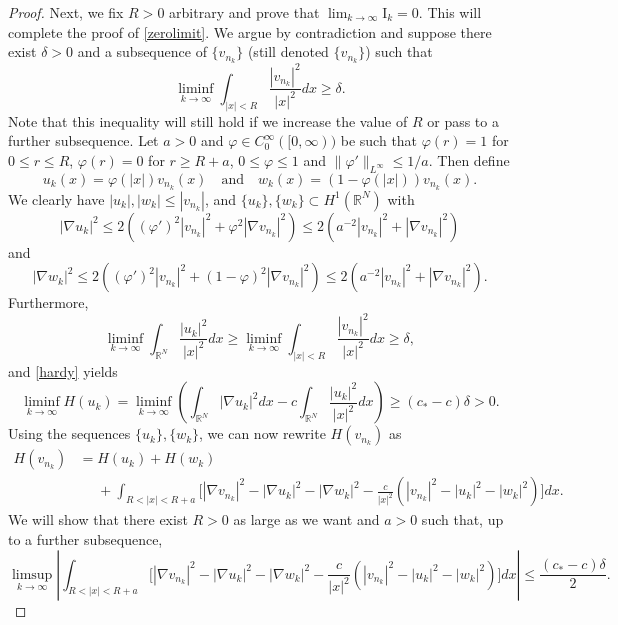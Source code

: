 \documentclass[reqno]{amsart}
\newcommand{\real}{\mathbb{R}}
\newcommand{\rn}{\real^N}
\newcommand{\intrn}{\int_{\real^N}}
\newcommand{\ffi}{\varphi}
\let\le=\leqslant
\let\ge= \geqslant
\theoremstyle{plain}
\theoremstyle{definition}
\numberwithin{equation}{section}
\begin{document}
\begin{proof}
Next, we fix $R>0$ arbitrary and prove that $\lim_{k\to\infty}\mathrm{I}_k=0$. 
This will complete the proof of \eqref{zerolimit}. 
We argue by contradiction and suppose there exist $\delta>0$ 
and a subsequence of $\{v_{n_k}\}$ (still denoted $\{v_{n_k}\}$) such that
\begin{equation*}\label{deltaR}
\liminf_{k\rightarrow\infty}\int_{|x|<R}\frac{|v_{n_k}|^2}{|x|^2}dx\ge\delta.
\end{equation*}
Note that this inequality will still hold if we increase the value of $R$ or pass to a further subsequence.
Let $a>0$ and $\ffi\in C_0^\infty([0,\infty))$ be such that $\ffi(r)=1$ for $0\le r \le R$,
$\ffi(r)=0$ for $r\ge R+a$, $0\le\ffi\le1$ and $\|\ffi'\|_{L^\infty}\le 1/a$. 
Then define
\[
u_k(x)=\ffi(|x|) v_{n_k}(x) \quad\text{and}\quad w_k(x)=(1-\ffi(|x|))v_{n_k}(x).
\]
We clearly have $|u_k|,|w_k|\le|v_{n_k}|$, and $\{u_k\},\{w_k\}\subset H^1(\rn)$ with  
\[
|\nabla u_k|^2 \le 2\left((\ffi')^2|v_{n_k}|^2+\ffi^2|\nabla v_{n_k}|^2\right)
\le 2\left(a^{-2}|v_{n_k}|^2+|\nabla v_{n_k}|^2\right)
\]
and
\[
|\nabla w_k|^2 \le 2\left((\ffi')^2|v_{n_k}|^2+(1-\ffi)^2|\nabla v_{n_k}|^2\right)
\le 2\left(a^{-2}|v_{n_k}|^2+|\nabla v_{n_k}|^2\right).
\]
Furthermore,
\begin{equation*}\label{deltaRuk}
\liminf_{k\rightarrow\infty}\intrn\frac{|u_k|^2}{|x|^2}dx\ge
\liminf_{k\rightarrow\infty}\int_{|x|<R}\frac{|v_{n_k}|^2}{|x|^2}dx\ge\delta,
\end{equation*}
and \eqref{hardy} yields
\begin{equation}\label{crucial}
\liminf_{k\rightarrow\infty}H(u_k)=\liminf_{k\rightarrow\infty}
\left(\intrn |\nabla u_k|^2dx-c\intrn\frac{|u_k|^2}{|x|^2}dx\right) \ge (c_*-c)\delta>0.
\end{equation}
Using the sequences $\{u_k\},\{w_k\}$, we can now rewrite $H(v_{n_k})$ as
\begin{align*}
H(v_{n_k})
&=H(u_k)+H(w_k) \\
&\phantom{=}+\int_{R<|x|<R+a} 
\Big[|\nabla v_{n_k}|^2-|\nabla u_k|^2-|\nabla w_k|^2
-\frac{c}{|x|^2}\left(|v_{n_k}|^2-|u_k|^2-|w_k|^2\right)\Big]dx.
\end{align*}
We will show that there exist $R>0$ as large as we want and $a>0$
such that, up to a further subsequence,
\begin{equation}\label{est0}
\limsup_{k\to\infty}\left|\int_{R<|x|<R+a} 
\Big[|\nabla v_{n_k}|^2-|\nabla u_k|^2-|\nabla w_k|^2
-\frac{c}{|x|^2}\left(|v_{n_k}|^2-|u_k|^2-|w_k|^2\right)\Big]dx\right|\le\frac{(c_*-c)\delta}{2}.
\end{equation}

\end{proof}
\end{document}

